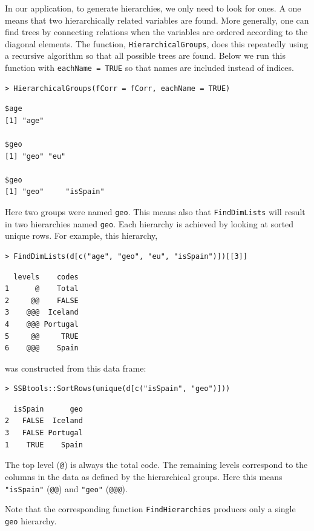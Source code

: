 In our application, to generate hierarchies, we only need to look for ones.
A one means that two hierarchically related variables are found.
More generally, one can find trees by connecting relations when the variables are ordered according to the diagonal elements.
The function, \texttt{HierarchicalGroups}, does this repeatedly using a recursive algorithm so that all possible trees are found.
Below we run this function with \texttt{eachName\ =\ TRUE} so that names are included instead of indices.

\begin{verbatim}
> HierarchicalGroups(fCorr = fCorr, eachName = TRUE)
\end{verbatim}

\begin{verbatim}
$age
[1] "age"

$geo
[1] "geo" "eu" 

$geo
[1] "geo"     "isSpain"
\end{verbatim}

Here two groups were named \texttt{geo}. This means also that \texttt{FindDimLists} will result in two hierarchies named \texttt{geo}.
Each hierarchy is achieved by looking at sorted unique rows.
For example, this hierarchy,

\begin{verbatim}
> FindDimLists(d[c("age", "geo", "eu", "isSpain")])[[3]]
\end{verbatim}

\begin{verbatim}
  levels    codes
1      @    Total
2     @@    FALSE
3    @@@  Iceland
4    @@@ Portugal
5     @@     TRUE
6    @@@    Spain
\end{verbatim}

was constructed from this data frame:

\begin{verbatim}
> SSBtools::SortRows(unique(d[c("isSpain", "geo")]))
\end{verbatim}

\begin{verbatim}
  isSpain      geo
2   FALSE  Iceland
3   FALSE Portugal
1    TRUE    Spain
\end{verbatim}

The top level (\texttt{@}) is always the total code. The remaining levels correspond to the columns in the data as defined by the hierarchical groups.
Here this means \texttt{"isSpain"} (\texttt{@@}) and \texttt{"geo"} (\texttt{@@@}).

Note that the corresponding function \texttt{FindHierarchies} produces only a single \texttt{geo} hierarchy.

